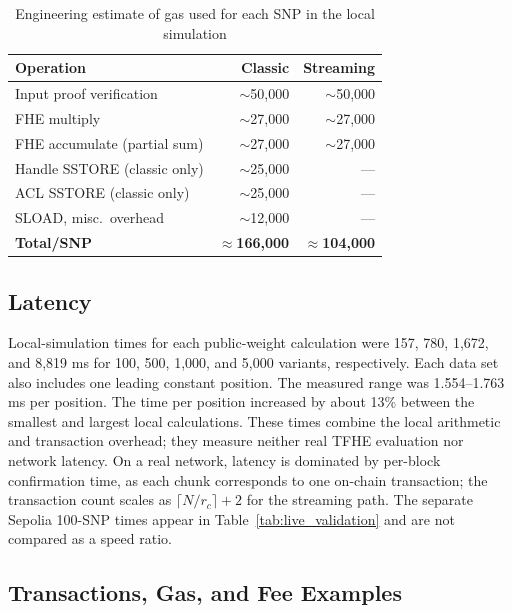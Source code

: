 \documentclass[10pt]{article}
\begin{document}
\begin{table}[ht]
\centering
\caption{Engineering estimate of gas used for each SNP in the local simulation}
\label{tab:persnp}
\small
\setlength{\tabcolsep}{4pt}
\begin{tabularx}{\columnwidth}{@{}Yrr@{}}
\toprule
\textbf{Operation} & \textbf{Classic} & \textbf{Streaming} \\
\midrule
Input proof verification         & $\sim$50,000 & $\sim$50,000 \\
FHE multiply                     & $\sim$27,000 & $\sim$27,000 \\
FHE accumulate (partial sum)     & $\sim$27,000 & $\sim$27,000 \\
Handle SSTORE (classic only)     &  $\sim$25,000 & --- \\
ACL SSTORE (classic only)        &  $\sim$25,000 & --- \\
SLOAD, misc.\ overhead           &   $\sim$12,000 & --- \\
\midrule
\textbf{Total/SNP}               & $\approx$\textbf{166,000} & $\approx$\textbf{104,000} \\
\bottomrule
\end{tabularx}
\end{table}

\subsection{Latency}

Local-simulation times for each public-weight calculation were 157, 780, 1,672, and
8,819 ms for 100, 500, 1,000, and 5,000 variants, respectively.  Each data set also
includes one leading constant position.  The measured range was 1.554--1.763 ms per
position.  The time per position increased by about 13\% between the smallest and
largest local calculations.  These times combine the local arithmetic and
transaction overhead; they measure neither real TFHE evaluation nor network latency.
On a real network, latency is dominated by per-block confirmation time, as each chunk
corresponds to one on-chain transaction; the transaction count scales as
$\lceil N / r_c \rceil + 2$ for the streaming path.  The separate Sepolia 100-SNP times
appear in Table~\ref{tab:live_validation} and are not compared as a speed ratio.

\subsection{Transactions, Gas, and Fee Examples}
\end{document}
